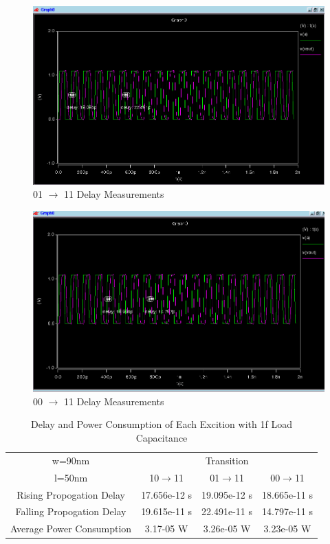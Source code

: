 \documentclass[12pt]{article}
\begin{document}
\begin{figure}[H]
\centering
\includegraphics[width=\linewidth]{01-11-delay}
\caption{01 $\to$ 11 Delay Measurements}
\label{fig:01-11-delay}
\end{figure}


\begin{figure}
\centering
\includegraphics[width=\linewidth]{00-11-delay}
\caption{00 $\to$ 11 Delay Measurements}
\label{fig:00-11-delay}
\end{figure}

\begin{table}[H]
	\begin{center}
		\begin{tabular}{ |c|c|c|c| }
			\hline
			w=90nm &
			\multicolumn{3}{|c|}{Transition} \\
			\cline{2-4} l=50nm & 10$\to$11 & 01$\to$11 & 00$\to$11 \\
			\hline
			Rising Propogation Delay & 17.656e-12 s & 19.095e-12 s & 18.665e-11 s  \\
			\hline
			Falling Propogation Delay & 19.615e-11 s& 22.491e-11 s& 14.797e-11 s\\
			\hline
			Average Power Consumption & 3.17-05 W& 3.26e-05 W& 3.23e-05 W\\
			\hline
		\end{tabular}
	\end{center}
	\caption{Delay and Power Consumption of Each Excition with 1f Load Capacitance}
	\label{tab:1st}
\end{table}
\end{document}
